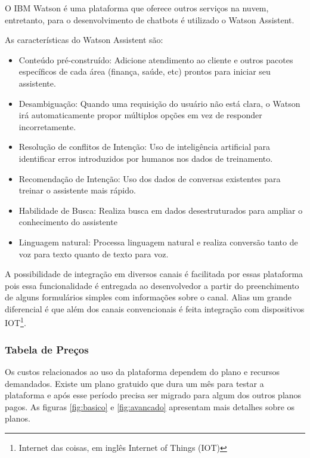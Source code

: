 O IBM Watson é uma plataforma que oferece outros serviços na nuvem, entretanto, para o desenvolvimento de chatbots é utilizado o Watson Assistent.

As características do Watson Assistent são:


\begin{itemize}
    \item Conteúdo pré-construído: Adicione atendimento ao cliente e outros pacotes específicos de cada área (finança, saúde, etc) prontos para iniciar seu assistente.
    \item Desambiguação: Quando uma requisição do usuário não está clara, o Watson irá automaticamente propor múltiplos opções em vez de responder incorretamente.
    \item Resolução de conflitos de Intenção:
Uso de inteligência artificial para identificar erros introduzidos por humanos nos dados de treinamento.
    \item Recomendação de Intenção: Uso dos dados de conversas existentes para treinar o assistente mais rápido.
    \item Habilidade de Busca: Realiza busca em dados desestruturados para ampliar o conhecimento do assistente
    
    \item Linguagem natural: Processa linguagem natural e realiza conversão tanto de voz para texto quanto de texto para voz.

\end{itemize}


A possibilidade de integração em diversos canais é facilitada por essas plataforma pois essa funcionalidade é entregada ao desenvolvedor a partir do preenchimento de alguns formulários simples com informações sobre o canal. Alias um grande diferencial é que além dos canais convencionais é feita integração com dispositivos IOT\footnote{Internet das coisas, em inglês Internet of Things (IOT)}.


\subsubsection{Tabela de Preços}

Os custos relacionados ao uso da plataforma dependem do plano e recursos demandados. Existe um plano gratuido que dura um mês para testar a plataforma e após esse período precisa ser migrado para algum dos outros planos pagos. As figuras \ref{fig:basico} e \ref{fig:avancado} apresentam mais detalhes sobre os planos. 



